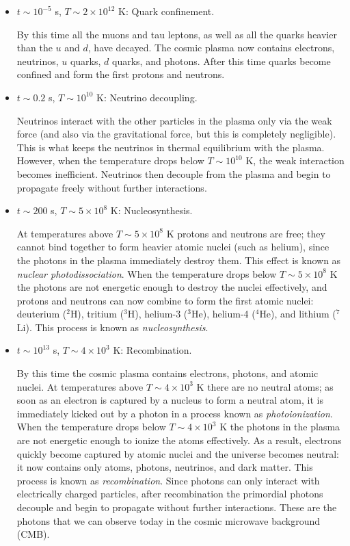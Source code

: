 \begin{itemize}

\item $t\sim 10^{-5}$ s, $T\sim 2\times10^{12}$ K: Quark confinement.

By this time all the muons and tau leptons, as well as all the quarks heavier than the $u$ and $d$, have decayed. The cosmic plasma now contains electrons, neutrinos, $u$ quarks, $d$ quarks, and photons. After this time quarks become confined and form the first protons and neutrons.

\item $t\sim 0.2$ s, $T\sim 10^{10}$ K: Neutrino decoupling.

Neutrinos interact with the other particles in the plasma only via the weak force (and also via the gravitational force, but this is completely negligible). This is what keeps the neutrinos in thermal equilibrium with the plasma. However, when the temperature drops below $T\sim 10^{10}$ K, the weak interaction becomes inefficient. Neutrinos then decouple from the plasma and begin to propagate freely without further interactions.

\item $t\sim 200$ s, $T\sim 5\times10^8$ K: Nucleosynthesis.

At temperatures above $T\sim 5\times10^8$ K protons and neutrons are free; they cannot bind together to form heavier atomic nuclei (such as helium), since the photons in the plasma immediately destroy them. This effect is known as {\it nuclear photodissociation}. When the temperature drops below $T\sim 5\times10^8$ K the photons are not energetic enough to destroy the nuclei effectively, and protons and neutrons can now combine to form the first atomic nuclei: deuterium ($^2$H), tritium ($^3$H), helium-3 ($^3$He), helium-4 ($^4$He), and lithium ($^7$Li). This process is known as {\it nucleosynthesis}.

\item $t\sim 10^{13}$ s, $T\sim 4\times10^3$ K: Recombination.

By this time the cosmic plasma contains electrons, photons, and atomic nuclei. At temperatures above $T\sim 4\times10^3$ K there are no neutral atoms; as soon as an electron is captured by a nucleus to form a neutral atom, it is immediately kicked out by a photon in a process known as {\it photoionization}. When the temperature drops below $T\sim 4\times10^3$ K the photons in the plasma are not energetic enough to ionize the atoms effectively. As a result, electrons quickly become captured by atomic nuclei and the universe becomes neutral: it now contains only atoms, photons, neutrinos, and dark matter. This process is known as {\it recombination}. Since photons can only interact with electrically charged particles, after recombination the primordial photons decouple and begin to propagate without further interactions. These are the photons that we can observe today in the cosmic microwave background (CMB).


\end{itemize}
